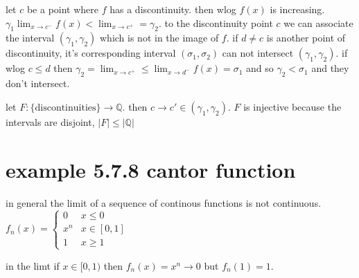 \documentclass[letterpaper]{article}
\begin{document}
let $c$ be a point where $f$ has a discontinuity. then wlog $f(x)$ is increasing. $\gamma_1\lim_{x\to c^-}f(x)<\lim_{x\to c^+}=\gamma_2$. to the discontinuity point $c$ we can associate the interval $(\gamma_1,\gamma_2)$ which  is not in the image of $f$. if $d\ne c$ is another point of discontinuity, it's corresponding interval $(\sigma_1,\sigma_2)$ can not intersect $(\gamma_1,\gamma_2)$. if wlog $c\le d$ then $\gamma_2=\lim_{x\to c^+}\le\lim_{x\to d^-}f(x)=\sigma_1$ and so $\gamma_2<\sigma_1$ and they don't intersect.


let $F:\{\text{discontinuities}\}\to\mathbb{Q}$. then $c\to c'\in(\gamma_1,\gamma_2)$. $F$ is injective because the intervals are disjoint, $|F|\le|\mathbb{Q}|$

\section*{example 5.7.8 cantor function}

in general the limit of a sequence of continous functions is not continuous. $f_n(x)=\begin{cases}0&x\le0\\x^n&x\in[0,1]\\1&x\ge 1\end{cases}$

in the limt if $x\in[0,1)$ then $f_n(x)=x^n\rightarrow0$ but $f_n(1)=1$.
\end{document}
